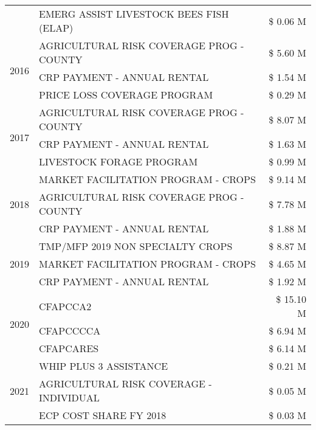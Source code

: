 \begin{tabular}{llr}
 & EMERG ASSIST LIVESTOCK BEES FISH (ELAP) & \$ 0.06 M \\
\cline{1-3}
\multirow[t]{3}{*}{2016} & AGRICULTURAL RISK COVERAGE PROG - COUNTY & \$ 5.60 M \\
 & CRP PAYMENT - ANNUAL RENTAL & \$ 1.54 M \\
 & PRICE LOSS COVERAGE PROGRAM & \$ 0.29 M \\
\cline{1-3}
\multirow[t]{3}{*}{2017} & AGRICULTURAL RISK COVERAGE PROG - COUNTY & \$ 8.07 M \\
 & CRP PAYMENT - ANNUAL RENTAL & \$ 1.63 M \\
 & LIVESTOCK FORAGE PROGRAM & \$ 0.99 M \\
\cline{1-3}
\multirow[t]{3}{*}{2018} & MARKET FACILITATION PROGRAM - CROPS & \$ 9.14 M \\
 & AGRICULTURAL RISK COVERAGE PROG - COUNTY & \$ 7.78 M \\
 & CRP PAYMENT - ANNUAL RENTAL & \$ 1.88 M \\
\cline{1-3}
\multirow[t]{3}{*}{2019} & TMP/MFP 2019 NON SPECIALTY CROPS & \$ 8.87 M \\
 & MARKET FACILITATION PROGRAM - CROPS & \$ 4.65 M \\
 & CRP PAYMENT - ANNUAL RENTAL & \$ 1.92 M \\
\cline{1-3}
\multirow[t]{3}{*}{2020} & CFAPCCA2 & \$ 15.10 M \\
 & CFAPCCCCA & \$ 6.94 M \\
 & CFAPCARES & \$ 6.14 M \\
\cline{1-3}
\multirow[t]{3}{*}{2021} & WHIP PLUS 3 ASSISTANCE & \$ 0.21 M \\
 & AGRICULTURAL RISK COVERAGE - INDIVIDUAL & \$ 0.05 M \\
 & ECP COST SHARE FY 2018 & \$ 0.03 M \\
\cline{1-3}
\bottomrule
\end{tabular}
